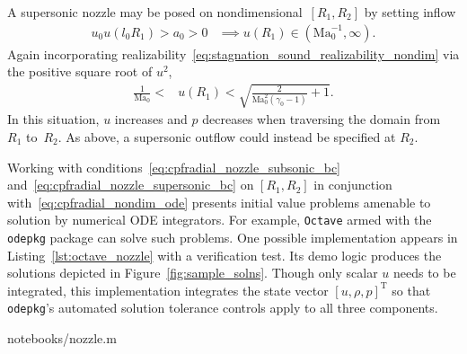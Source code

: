 \documentclass[letterpaper,11pt,nointlimits,reqno]{amsart}
\newcommand{\Mach}[1][]{\mbox{Ma}_{#1}}
\begin{document}
A supersonic nozzle may be posed on nondimensional~$\left[R_{1}, R_{2}\right]$
by setting inflow
\begin{align}
   u_0 u\!\left(l_0 R_{1}\right) > a_0 > 0
   &\implies
   u\!\left(R_{1}\right) \in \left(\Mach[0]^{-1}, \infty\right)
.
\end{align}
Again incorporating
realizability~\eqref{eq:stagnation_sound_realizability_nondim} via the positive
square root of $u^2$,
\begin{align}
  \frac{1}{\Mach[0]} < &u\!\left(R_1\right)
  < \sqrt{\frac{2}{\Mach[0]^2\left(\gamma_0-1\right)}+1}
\label{eq:cpfradial_nozzle_supersonic_bc}
.
\end{align}
In this situation, $u$ increases and $p$ decreases when traversing the domain
from~$R_{1}$ to~$R_{2}$.  As above, a supersonic outflow could instead be
specified at $R_{2}$.

Working with conditions~\eqref{eq:cpfradial_nozzle_subsonic_bc}
and~\eqref{eq:cpfradial_nozzle_supersonic_bc} on $\left[R_1, R_2\right]$ in
conjunction with~\eqref{eq:cpfradial_nondim_ode} presents initial value
problems amenable to solution by numerical ODE integrators.  For example,
\texttt{Octave}\citep{Eaton2008GNU} armed with the \texttt{odepkg} package can
solve such problems.  One possible implementation appears in
Listing~\ref{lst:octave_nozzle} with a verification test.  Its demo logic
produces the solutions depicted in Figure~\ref{fig:sample_solns}.  Though only
scalar $u$ needs to be integrated, this implementation integrates the state
vector $\left[u, \rho, p\right]^\mathrm{T}$ so that \texttt{odepkg}'s automated
solution tolerance controls apply to all three components.


                {notebooks/nozzle.m}
\end{document}

